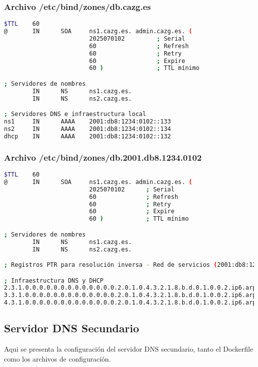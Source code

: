 \subsubsection{Archivo /etc/bind/zones/db.cazg.es}
\label{Apendice2:db.cazg.es}
\begin{lstlisting}[language=bash]
$TTL    60
@       IN      SOA     ns1.cazg.es. admin.cazg.es. (
                        2025070102         ; Serial 
                        60                 ; Refresh
                        60                 ; Retry
                        60                 ; Expire
                        60 )               ; TTL mínimo

; Servidores de nombres
        IN      NS      ns1.cazg.es.
        IN      NS      ns2.cazg.es.

; Servidores DNS e infraestructura local
ns1     IN      AAAA    2001:db8:1234:0102::133
ns2     IN      AAAA    2001:db8:1234:0102::134
dhcp    IN      AAAA    2001:db8:1234:0102::132
\end{lstlisting}

\subsubsection{Archivo /etc/bind/zones/db.2001.db8.1234.0102}
\label{Apendice2:db.2001.db8.1234.0102}
\begin{lstlisting}[language=bash]
$TTL    60
@       IN      SOA     ns1.cazg.es. admin.cazg.es. (
                        2025070102      ; Serial
                        60              ; Refresh
                        60              ; Retry
                        60              ; Expire
                        60 )            ; TTL mínimo

; Servidores de nombres
        IN      NS      ns1.cazg.es.
        IN      NS      ns2.cazg.es.

; Registros PTR para resolución inversa - Red de servicios (2001:db8:1234:0102::/64)

; Infraestructura DNS y DHCP
2.3.1.0.0.0.0.0.0.0.0.0.0.0.0.0.2.0.1.0.4.3.2.1.8.b.d.0.1.0.0.2.ip6.arpa. IN PTR dhcp.cazg.es.
3.3.1.0.0.0.0.0.0.0.0.0.0.0.0.0.2.0.1.0.4.3.2.1.8.b.d.0.1.0.0.2.ip6.arpa. IN PTR ns1.cazg.es.
4.3.1.0.0.0.0.0.0.0.0.0.0.0.0.0.2.0.1.0.4.3.2.1.8.b.d.0.1.0.0.2.ip6.arpa. IN PTR ns2.cazg.es.
\end{lstlisting}

\subsection{Servidor DNS Secundario}
Aqui se presenta la configuración del servidor DNS secundario, tanto el Dockerfile como los archivos de configuración.


